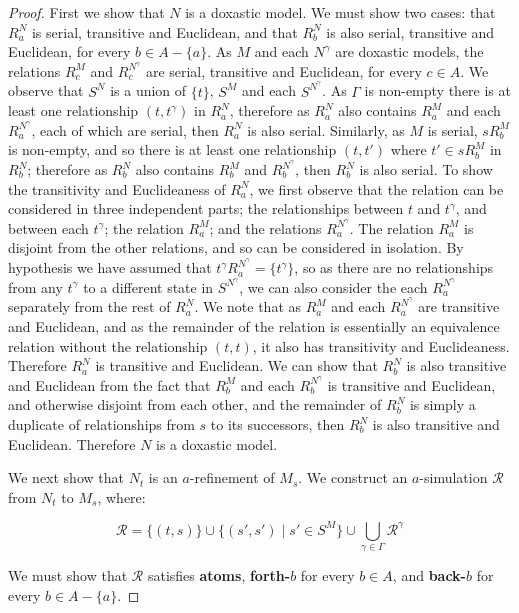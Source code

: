 \begin{proof}
First we show that $N$ is a doxastic model. We must show two cases: that $R^N_a$
is serial, transitive and Euclidean, and that $R^N_b$ is also serial, transitive
and Euclidean, for every $b \in A - \{a\}$. As $M$ and each $N^\gamma$ are doxastic
models, the relations $R^M_c$ and $R^{N^\gamma}_c$ are serial, transitive and
Euclidean, for every $c \in A$. We observe that $S^N$ is a union of $\{t\}$,
$S^M$ and each $S^{N^\gamma}$. As $\Gamma$ is non-empty there is at
least one relationship $(t, t^\gamma)$ in $R^N_a$, therefore as $R^N_a$ also
contains $R^M_a$ and each $R^{N^\gamma}_a$, each of which are serial, then $R^N_a$
is also serial. Similarly, as $M$ is serial, $sR^M_b$ is non-empty, and so there
is at least one relationship $(t, t')$ where $t' \in sR^M_b$ in $R^N_b$;
therefore as $R^N_b$ also contains $R^M_b$ and $R^{N^\gamma}_b$, then $R^N_b$ is
also serial. To show the transitivity and Euclideaness of $R^N_a$, we first
observe that the relation can be considered in three independent parts; the
relationships between $t$ and $t^\gamma$, and between each $t^\gamma$; the
relation $R^M_a$; and the relations $R^{N^\gamma}_a$. The relation $R^M_a$ is
disjoint from the other relations, and so can be considered in isolation. By
hypothesis we have assumed that $t^\gamma R^{N^\gamma}_a = \{t^\gamma\}$, so as
there are no relationships from any $t^\gamma$ to a different state in
$S^{N^\gamma}$, we can also consider the each $R^{N^\gamma}_a$ separately from
the rest of $R^N_a$. We note that as $R^M_a$ and each $R^{N^\gamma}_a$ are
transitive and Euclidean, and as the remainder of the relation is essentially an
equivalence relation without the relationship $(t, t)$, it also has transitivity
and Euclideaness. Therefore $R^N_a$ is transitive and Euclidean. We can show
that $R^N_b$ is also transitive and Euclidean from the fact that $R^M_b$ and
each $R^{N^\gamma}_b$ is transitive and Euclidean, and otherwise disjoint from
each other, and the remainder of $R^N_b$ is simply a duplicate of relationships
from $s$ to its successors, then $R^N_b$ is also transitive and Euclidean.
Therefore $N$ is a doxastic model.

We next show that $N_t$ is an $a$-refinement of $M_s$. We construct an
$a$-simulation $\mathcal{R}$ from $N_t$ to $M_s$, where:

$$\mathcal{R} = \{(t, s)\} \cup \{(s', s') \mid s' \in S^M \} \cup \bigcup_{\gamma \in \Gamma} \mathcal{R}^\gamma$$

We must show that $\mathcal{R}$ satisfies {\bf atoms}, {\bf forth-$b$} for every
$b \in A$, and {\bf back-$b$} for every $b \in A - \{a\}$.


\end{proof}

